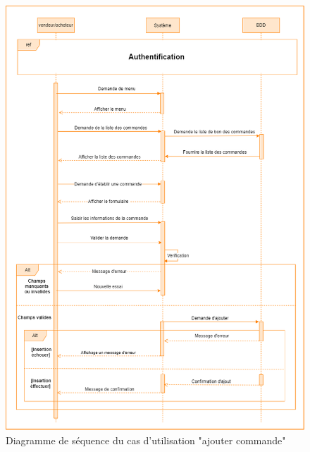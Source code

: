 \documentclass[edit,12pt,a4paper,ChapStyle,oneside,doubleinterligne]{report}
\begin{document}
\begin{figure}[h!]\label{fig:Diagramme cas1}
\centering
\includegraphics[width=1\textwidth]{images/seq etablier commande.png}
\caption{Diagramme de séquence du cas d'utilisation "ajouter commande"}
\end{figure}

\clearpage
\end{document}
